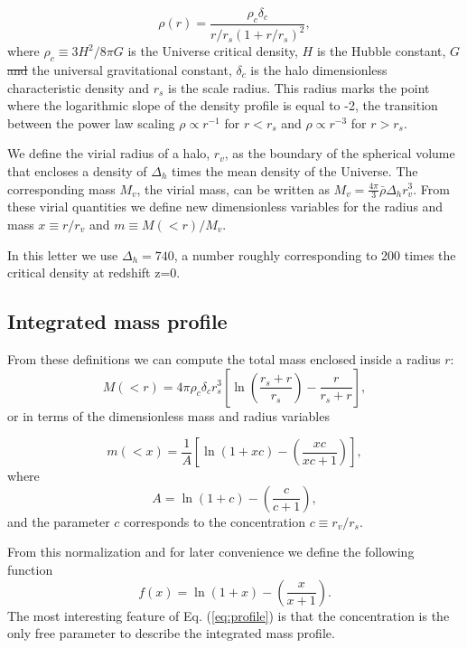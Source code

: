 \documentclass{emulateapj}
\providecommand{\DIFdel}[1]{{\protect\color{red}\sout{#1}}}                      %
\providecommand{\DIFdelbegin}{} %
\providecommand{\DIFdelend}{} %
\begin{document}
\begin{equation}
\rho(r) = \frac{\rho_c\delta_c}{r/r_s(1+r/r_s)^2},
\label{eq:definition}
\end{equation}
%
where $\rho_c\equiv 3H^2/8\pi G$ is the Universe critical density, $H$
is the Hubble constant, $G$ \DIFdelbegin \DIFdel{and }\DIFdelend the universal gravitational constant,
$\delta_c$ is the halo dimensionless characteristic density and $r_s$
is the scale radius.  This radius marks the point where the
logarithmic slope of the density profile is equal to -2, the
transition between the power law scaling $\rho\propto r^{-1}$ for
$r<r_s$ and $\rho\propto r^{-3}$ for $r>r_s$.

We define the virial radius of a halo, $r_v$, as the boundary of the
spherical volume that encloses a density of $\Delta_h$ times the mean
density of the Universe.  The corresponding mass $M_{v}$, the virial
mass, can be written as $M_{v} = \frac{4\pi}{3}\bar{\rho}\Delta_h
r_v^3$.  From these virial quantities we define new dimensionless
variables for the radius and mass $x\equiv r/r_v$ and $m\equiv
M(<r)/M_v$.

In this letter we use $\Delta_h=740$, a number roughly corresponding to
200 times the critical density at redshift z=0. 


\subsection{Integrated mass profile}

From these definitions we can compute the total mass enclosed inside a
radius $r$:
\begin{equation}
M(<r) = 4\pi\rho_c\delta_c  r_s^3\left[\ln \left
  (\frac{r_s+r}{r_s}\right) - \frac{r}{r_s+r}\right],
\end{equation}
%
or in terms of the dimensionless mass and radius variables

\begin{equation}
m(<x) =
\frac{1}{A}\left[\ln\left(1+xc\right)-\left(\frac{xc}{xc+1}\right)\right],
\label{eq:profile}
\end{equation}
%
where
%
\begin{equation}
A=\ln\left(1+c\right)-\left(\frac{c}{c+1}\right),
\end{equation}
%
and the parameter $c$ corresponds to the concentration $c\equiv
r_v/r_s$.

From this normalization and for later convenience we define the
following function
%
\begin{equation}
f(x) = \ln\left(1+x\right)-\left(\frac{x}{x+1}\right).
\label{eq:f_NFW}
\end{equation}
%
The most interesting feature of Eq. (\ref{eq:profile}) is that the
concentration is the only free parameter to describe the integrated
mass profile.
\end{document}
